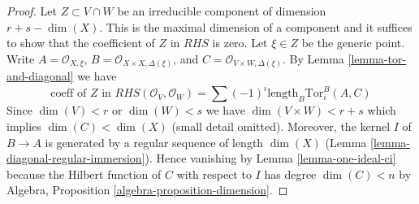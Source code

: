 \documentclass[10pt,a4paper]{amsart}
\theoremstyle{plain}
\theoremstyle{definition}
\theoremstyle{remark}
\numberwithin{equation}{subsection}
\begin{document}
\begin{proof}
\medskip\noindent
Let $Z \subset V \cap W$ be an irreducible component of dimension
$r + s - \dim(X)$. This is the maximal dimension of a component
and it suffices to show that the coefficient of $Z$ in $RHS$ is zero.
Let $\xi \in Z$ be the generic point. Write $A = \mathcal{O}_{X, \xi}$,
$B = \mathcal{O}_{X \times X, \Delta(\xi)}$, and
$C = \mathcal{O}_{V \times W, \Delta(\xi)}$.
By Lemma \ref{lemma-tor-and-diagonal} we have
$$
\text{coeff of }Z\text{ in }
RHS(\mathcal{O}_V, \mathcal{O}_W) = 
\sum (-1)^i
\text{length}_B \text{Tor}_i^B(A, C)
$$
Since $\dim(V) < r$ or $\dim(W) < s$ we have $\dim(V \times W) < r + s$
which implies $\dim(C) < \dim(X)$ (small detail omitted). Moreover, the
kernel $I$ of $B \to A$ is generated by a regular sequence of
length $\dim(X)$ (Lemma \ref{lemma-diagonal-regular-immersion}).
Hence vanishing by Lemma \ref{lemma-one-ideal-ci} because
the Hilbert function of $C$ with respect to $I$ has degree $\dim(C) < n$
by Algebra, Proposition \ref{algebra-proposition-dimension}.
\end{proof}
\end{document}
